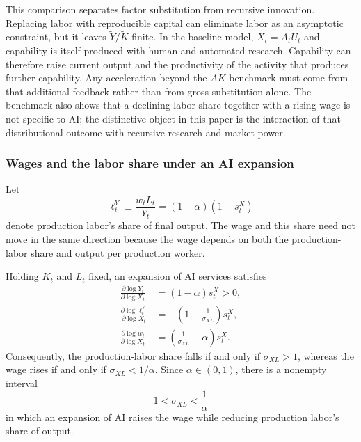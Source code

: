 This comparison separates factor substitution from recursive innovation. Replacing
labor with reproducible capital can eliminate labor as an asymptotic constraint, but
it leaves $\widetilde Y/\widetilde K$ finite. In the baseline model, $X_t=A_tU_t$
and capability is itself produced with human and automated research. Capability can
therefore raise current output and the productivity of the activity that produces
further capability. Any acceleration beyond the $AK$ benchmark must come from that
additional feedback rather than from gross substitution alone. The benchmark also
shows that a declining labor share together with a rising wage is not specific to
AI; the distinctive object in this paper is the interaction of that distributional
outcome with recursive research and market power.

\subsubsection{Wages and the labor share under an AI expansion}

Let
\begin{equation}
    \ell^Y_t\equiv\frac{w_tL_t}{Y_t}
    =(1-\alpha)(1-s^X_t)
    \label{eq:production-labor-share}
\end{equation}
denote production labor's share of final output. The wage and this share need not
move in the same direction because the wage depends on both the production-labor
share and output per production worker.

\begin{proposition}
\label{prop:wage-share-thresholds}
Holding $K_t$ and $L_t$ fixed, an expansion of AI services satisfies
\begin{align}
    \frac{\partial\log Y_t}{\partial\log X_t}
    &=(1-\alpha)s^X_t>0,
    \label{eq:output-ai-elasticity}\\
    \frac{\partial\log \ell^Y_t}{\partial\log X_t}
    &=-\left(1-\frac{1}{\sigma_{XL}}\right)s^X_t,
    \label{eq:labor-share-ai-elasticity}\\
    \frac{\partial\log w_t}{\partial\log X_t}
    &=\left(\frac{1}{\sigma_{XL}}-\alpha\right)s^X_t.
    \label{eq:wage-ai-elasticity}
\end{align}
Consequently, the production-labor share falls if and only if $\sigma_{XL}>1$, whereas
the wage rises if and only if $\sigma_{XL}<1/\alpha$. Since $\alpha\in(0,1)$, there is
a nonempty interval
\begin{equation}
    1<\sigma_{XL}<\frac{1}{\alpha}
    \label{eq:wage-share-decoupling-region}
\end{equation}
in which an expansion of AI raises the wage while reducing production labor's share
of output.
\end{proposition}

